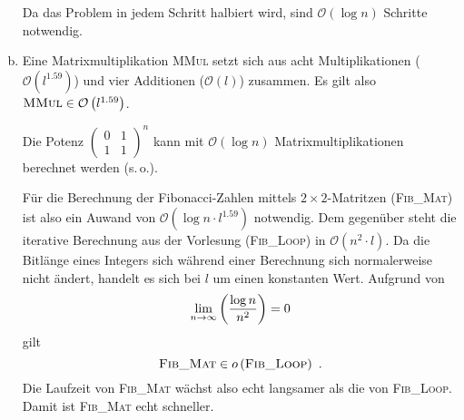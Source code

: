 \documentclass[a4paper]{scrartcl}
\begin{document}
\begin{enumerate}[(a)]
        Da das Problem in jedem Schritt halbiert wird, sind
        $\mathcal{O}\left( \log n \right)$ Schritte notwendig.

    \item
        Eine Matrixmultiplikation \textsc{MMul} setzt sich aus acht Multiplikationen
        ($\mathcal{O}\left( l^{\num{1,59}} \right)$) und vier Additionen
        ($\mathcal{O}(l)$) zusammen.
        Es gilt also $\textsc{MMul} \in \mathcal{O} \left( l^{\num{1,59}} \right)$.

        Die Potenz $\begin{pmatrix} 0 & 1 \\ 1 & 1 \end{pmatrix}^n$ kann mit
        $\mathcal{O} \left( \log n \right)$ Matrixmultiplikationen berechnet
        werden (s.\,o.).

        Für die Berechnung der Fibonacci-Zahlen mittels $2 \times 2$-Matritzen
        (\textsc{Fib\_Mat}) ist also ein Auwand von
        $\mathcal{O}\left( \log n \cdot l^{\num{1,59}} \right)$ notwendig.
        Dem gegenüber steht die iterative Berechnung aus der Vorlesung
        (\textsc{Fib\_Loop}) in $\mathcal{O} \left( n^2 \cdot l \right)$.
        Da die Bitlänge eines Integers sich während einer Berechnung sich
        normalerweise nicht ändert, handelt es sich bei $l$ um einen konstanten
        Wert.
        Aufgrund von
        \begin{equation}
            \lim_{n \to \infty} \left( \frac{\log n}{n^2} \right) = 0
        \end{equation}
        gilt
        \begin{equation}
            \textsc{Fib\_Mat} \in o \left( \textsc{Fib\_Loop} \right) \text{ .}
        \end{equation}
        Die Laufzeit von \textsc{Fib\_Mat} wächst also echt langsamer als die
        von \textsc{Fib\_Loop}.
        Damit ist \textsc{Fib\_Mat} echt schneller.

\end{enumerate}
\end{document}
